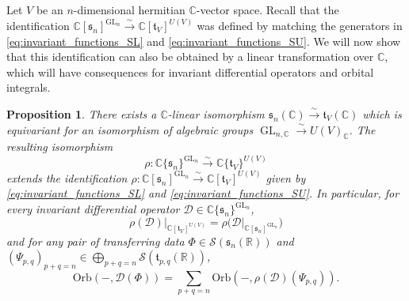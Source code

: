 \documentclass[reqno, 11pt]{amsart} %
\numberwithin{equation}{section}
\theoremstyle{plain}
\newtheorem{proposition}[theorem]{Proposition}
\theoremstyle{definition}
\theoremstyle{remark}
\newcommand{\lr}{\longrightarrow}
\newcommand{\mbC}{\mathbb{C}}
\newcommand{\mbR}{\mathbb{R}}
\newcommand{\mcD}{\mathcal{D}}
\newcommand{\mcS}{\mathcal{S}}
\newcommand{\mfs}{\mathfrak{s}}
\newcommand{\mft}{\mathfrak{t}}
\newcommand{\simto}{\overset{\sim}{\to}}
\newcommand{\simlr}{\overset{\sim}{\lr}}
\DeclareMathOperator{\GL}{GL}
\newcommand{\Orb}{\mathrm{Orb}}
\begin{document}
Let $V$ be an $n$-dimensional hermitian $\mbC$-vector space. Recall that the identification $\mbC[\mfs_n]^{\GL_n}\simto \mbC[\mft_V]^{U(V)}$ was defined by matching the generators in \eqref{eq:invariant_functions_SL} and \eqref{eq:invariant_functions_SU}. We will now show that this identification can also be obtained by a linear transformation over $\mbC$, which will have consequences for invariant differential operators and orbital integrals.

\begin{proposition}\label{prop:inv_diff_op_isomorphic}
There exists a $\mbC$-linear isomorphism $\mfs_n(\mbC)\simto \mft_V(\mbC)$ which is equivariant for an isomorphism of algebraic groups $\GL_{n,\mbC}\simto U(V)_\mbC$. The resulting isomorphism
$$ρ:\mbC\{\mfs_n\}^{\GL_n} \simlr \mbC\{\mft_V\}^{U(V)}$$
extends the identification $ρ:\mbC[\mfs_n]^{\GL_n} \simlr \mbC[\mft_V]^{U(V)}$ given by \eqref{eq:invariant_functions_SL} and \eqref{eq:invariant_functions_SU}. In particular, for every invariant differential operator $\mcD\in \mbC\{\mfs_n\}^{\GL_n}$,
$$ρ(\mcD)\vert_{\mbC[\mft_V]^{U(V)}} = ρ\big(\mcD\vert_{\mbC[\mfs_n]^{\GL_n}}\big)$$
and for any pair of transferring data $Φ \in \mcS(\mfs_n(\mbR))$ and $(Ψ_{p,q})_{p+q = n} \in \bigoplus_{p+q = n} \mcS(\mft_{p,q}(\mbR))$,
\begin{equation}\label{eq:transfer_inv_diff_op}
\Orb(-,\mcD(Φ)) = \sum_{p + q = n} \Orb(-,ρ(\mcD)(Ψ_{p,q})).
\end{equation}
\end{proposition}
\end{document}
